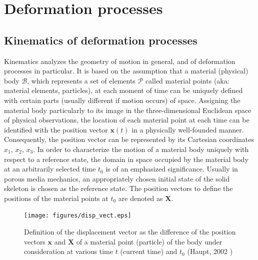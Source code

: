 \newpage
\section{Deformation processes}
\label{sec:def_proc}

\subsection{Kinematics of deformation processes}
\label{sec:kinematics}

Kinematics analyzes the geometry of motion in general, and of deformation processes in particular. It is based on the assumption that a material (physical) body $\mathcal{B}$, which represents a set of elements $\mathcal{P}$ called material points (aka: material elements, particles), at each moment of time can be uniquely defined with certain parts (usually different if motion occurs) of space. Assigning the material body particularly to its image in the three-dimensional Euclidean space of physical observations, the location of each material point at each time can be identified with the position vector $\mathbf{x}(t)$ in a physically well-founded manner. Consequently, the position vector can be represented by its Cartesian coordinates $x_1,\,x_2,\,x_3$. In order to characterize the motion of a material body uniquely with respect to a reference state, the domain in space occupied by the material body at an arbitrarily selected time $t_0$ is of an emphasized significance. Usually in porous media mechanics, an appropriately chosen initial state of the solid skeleton is chosen as the reference state. The position vectors to define the positions of the material points at $t_0$ are denoted as $\mathbf{X}$.

\begin{figure}[htb!]
\begin{center}
\footnotesize
\texttt{[image: figures/disp\_vect.eps]}
\caption{Definition of the displacement vector as the difference of the position vectors $\mathbf{x}$ and $\mathbf{X}$ of a material point (particle) of the body under consideration at various time $t$ (current time) and $t_0$ (Haupt, 2002 \cite{Haupt:2002})}
\label{fig:disp_vect}
\end{center}
\end{figure}

